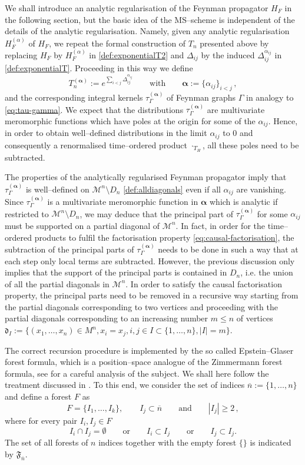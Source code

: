 \documentclass[a4paper,10pt,twoside]{article}
\numberwithin{equation}{section}
\newcounter{and}
\def\M{\mathcal{M}}
\def\balpha{{\boldsymbol{\alpha}}}
\theoremstyle{plain}
\theoremstyle{definition}
\begin{document}
We shall introduce an analytic regularisation of the Feynman propagator $H_F$ in the following section, but the basic idea of the MS--scheme is independent of the details of the analytic regularisation. Namely, given 
any analytic regularisation $H^{(\alpha)}_F$ of $H_F$, we repeat the formal construction of $T_n$ presented above by replacing $H_F$ by $H^{(\alpha)}_F$ in \eqref{def:exponentialT2} and $\Delta_{ij}$ by the induced $\Delta^{\alpha_{ij}}_{ij}$ in \eqref{def:exponentialT}. Proceeding in this way we define 
\[
T^{(\balpha)}_n := e^{\sum_{i<j}\Delta^{\alpha_{ij}}_{ij}} \qquad \text{with}\qquad\balpha := \{\alpha_{ij}\}_{i<j}\,,
\]
and the corresponding integral kernels $\tau^{(\balpha)}_\Gamma$ of Feynman graphs $\Gamma$ in analogy to \eqref{eq:tau-gamma}. We expect that the distributions $\tau^{(\balpha)}_\Gamma$ are multivariate meromorphic functions which have poles at the origin for some of the $\alpha_{ij}$. 
Hence, in order to obtain well--defined distributions in the limit $\alpha_{ij}$ to $0$ and consequently a renormalised time--ordered product $\cdot_{T_H}$, all these poles need to be subtracted.

The properties of the analytically regularised Feynman propagator imply that $\tau^{(\balpha)}_\Gamma$ is well--defined on $ \M^n \setminus D_n $ \eqref{def:alldiagonals} even if all $\alpha_{ij}$ are vanishing. Since $\tau^{(\balpha)}_\Gamma$ is a multivariate meromorphic function in $\balpha$  which is analytic if restricted to $\M^n\setminus D_n$, we may deduce that the principal part of $\tau^{(\balpha)}_\Gamma$ for some $\alpha_{ij}$ must be supported on a partial diagonal of $\M^n$. In fact, in order for the time--ordered products to fulfil the factorisation property \eqref{eq:causal-factorisation}, the subtraction of the principal parts of $\tau^{(\balpha)}_\Gamma$ needs to be done in such a way that at each step only local terms are subtracted. However, the previous discussion only implies that the support of the principal parts is contained in $D_n$, i.e. the union of all the partial diagonals in $\M^n$. In order to satisfy the causal factorisation property, the principal parts need to be removed in a recursive way starting from the partial diagonals corresponding to two vertices and proceeding with the partial diagonals corresponding to an increasing number $m\le n$ of vertices $\mathfrak{d}_{I}:=\{ (x_1,\dots, x_n) \in M^n, x_i=x_j, i,j \in I\subset \{1,\dots, n\} , |I|=m\}$.

The correct recursion procedure is implemented by the so called Epstein--Glaser forest formula, which is a position--space analogue of the Zimmermann forest formula, see  \cite{Hollands:2010pr, Keller, dfkr} for a careful analysis of the subject. We shall here follow the treatment discussed in \cite{dfkr}. To this end, we consider the set of indices $\overline{n} := \{1,\dots , n\}$ and define a forest $F$ as 
\[
F =\{ I_1,\dots, I_k\}, \qquad I_j \subset \overline{n}\qquad\text{and} \qquad |I_j|\geq 2 \,,
\]
where for every pair $I_i,I_j\in F$
\[
I_i\cap I_j = \emptyset  \qquad \text{or}   \qquad I_i \subset I_j   \qquad \text{or}   \qquad  I_j\subset I_j.
\]
The set of all forests of $n$ indices together with the empty forest $\{\}$ is indicated by $\mathfrak{F}_{\overline{n}}$.
\end{document}
